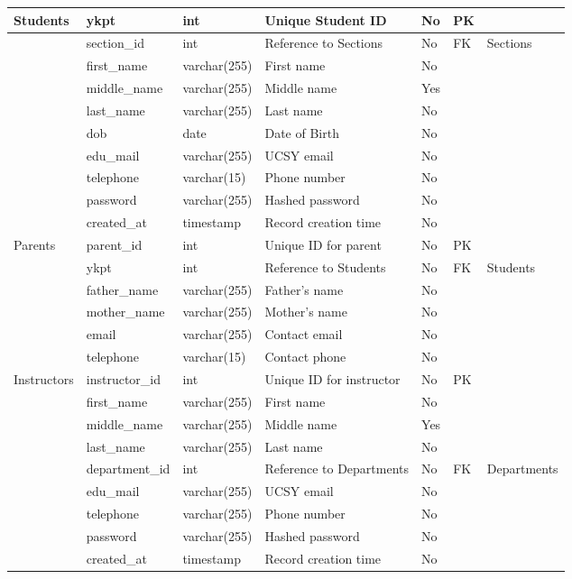 \documentclass[12pt,a4paper]{report}
\begin{document}
\begin{xltabular}{\textwidth}{|L|L|L|Y|L|L|L|}
    Students & ykpt & int & Unique Student ID & No & PK & \\ \hline
     & section\_id & int & Reference to Sections & No & FK & Sections \\ \hline
     & first\_name & varchar(255) & First name & No & & \\ \hline
     & middle\_name & varchar(255) & Middle name & Yes & & \\ \hline
     & last\_name & varchar(255) & Last name & No & & \\ \hline
     & dob & date & Date of Birth & No & & \\ \hline
     & edu\_mail & varchar(255) & UCSY email & No & & \\ \hline
     & telephone & varchar(15) & Phone number & No & & \\ \hline
     & password & varchar(255) & Hashed password & No & & \\ \hline
     & created\_at & timestamp & Record creation time & No & & \\ \hline

    Parents & parent\_id & int & Unique ID for parent & No & PK & \\ \hline
     & ykpt & int & Reference to Students & No & FK & Students \\ \hline
     & father\_name & varchar(255) & Father's name & No & & \\ \hline
     & mother\_name & varchar(255) & Mother's name & No & & \\ \hline
     & email & varchar(255) & Contact email & No & & \\ \hline
     & telephone & varchar(15) & Contact phone & No & & \\ \hline

    Instructors & instructor\_id & int & Unique ID for instructor & No & PK & \\ \hline
     & first\_name & varchar(255) & First name & No & & \\ \hline
     & middle\_name & varchar(255) & Middle name & Yes & & \\ \hline
     & last\_name & varchar(255) & Last name & No & & \\ \hline
     & department\_id & int & Reference to Departments & No & FK & Departments \\ \hline
     & edu\_mail & varchar(255) & UCSY email & No & & \\ \hline
     & telephone & varchar(255) & Phone number & No & & \\ \hline
     & password & varchar(255) & Hashed password & No & & \\ \hline
     & created\_at & timestamp & Record creation time & No & & \\ \hline


\end{xltabular}
\end{document}
